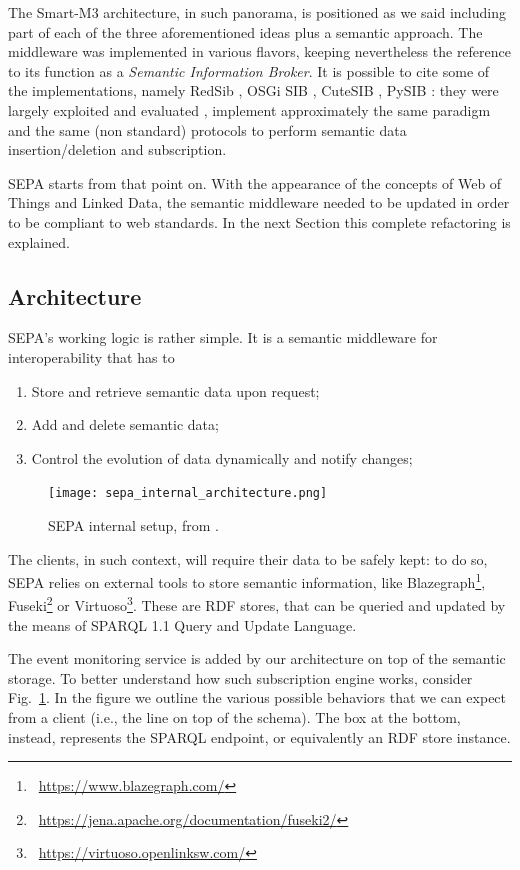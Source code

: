 The Smart-M3 architecture, in such panorama, is positioned as we said including part of each of the three aforementioned ideas plus a semantic approach. The middleware was implemented in various flavors, keeping nevertheless the reference to its function as a \textit{Semantic Information Broker}. It is possible to cite some of the implementations, namely RedSib \cite{morandi2012redsib}, OSGi SIB \cite{manzaroli2010smart}, CuteSIB \cite{galov2015design}, PySIB \cite{viola2016modular}: they were largely exploited and evaluated \cite{Viola2016PerformanceES,viola2016m3}, implement approximately the same paradigm and the same (non standard) protocols to perform semantic data insertion/deletion and subscription.

SEPA starts from that point on. With the appearance of the concepts of Web of Things and Linked Data, the semantic middleware needed to be updated in order to be compliant to web standards. In the next Section this complete refactoring is explained.

\subsection{Architecture}

SEPA's working logic is rather simple. It is a semantic middleware for interoperability that has to
\begin{enumerate}
\item Store and retrieve semantic data upon request;
\item Add and delete semantic data;
\item Control the evolution of data dynamically and notify changes;
\end{enumerate}
\begin{figure}[t!]
\centering
\texttt{[image: sepa\_internal\_architecture.png]}
\caption{SEPA internal setup, from \cite{roffia2018dynamic}.}
\label{fig:sepa_schema}
\end{figure}
The clients, in such context, will require their data to be safely kept: to do so, SEPA relies on external tools to store semantic information, like Blazegraph\footnote{\faLink~\url{https://www.blazegraph.com/}}, Fuseki\footnote{\faLink~\url{https://jena.apache.org/documentation/fuseki2/}} or Virtuoso\footnote{\faLink~\url{https://virtuoso.openlinksw.com/}}. These are RDF stores, that can be queried and updated by the means of SPARQL 1.1 Query and Update Language.

The event monitoring service is added by our architecture on top of the semantic storage. To better understand how such subscription engine works, consider Fig.~\ref{fig:sepa_schema}. In the figure we outline the various possible behaviors that we can expect from a client (i.e., the line on top of the schema). The box at the bottom, instead, represents the SPARQL endpoint, or equivalently an RDF store instance. 

